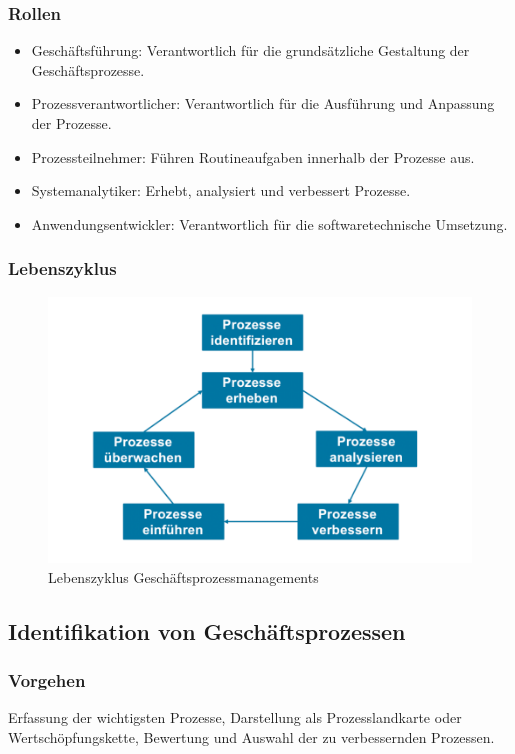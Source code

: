     \subsubsection*{Rollen}
        \begin{itemize}
            \item Geschäftsführung: Verantwortlich für die grundsätzliche Gestaltung der Geschäftsprozesse.
            \item Prozessverantwortlicher: Verantwortlich für die Ausführung und Anpassung der Prozesse.
            \item Prozessteilnehmer: Führen Routineaufgaben innerhalb der Prozesse aus.
            \item Systemanalytiker: Erhebt, analysiert und verbessert Prozesse.
            \item Anwendungsentwickler: Verantwortlich für die softwaretechnische Umsetzung.
        \end{itemize}
    \subsubsection*{Lebenszyklus}
        \begin{figure}[h]
            \centering
            \includegraphics[width=\textwidth]{image/Lebenszyklus.png}
            \caption{Lebenszyklus Geschäftsprozessmanagements}
            \label{fig:Lebenszyklus}
        \end{figure}

\subsection{Identifikation von Geschäftsprozessen}
    \subsubsection*{Vorgehen}
        Erfassung der wichtigsten Prozesse, Darstellung als Prozesslandkarte oder Wertschöpfungskette, Bewertung und Auswahl der zu verbessernden Prozessen.
